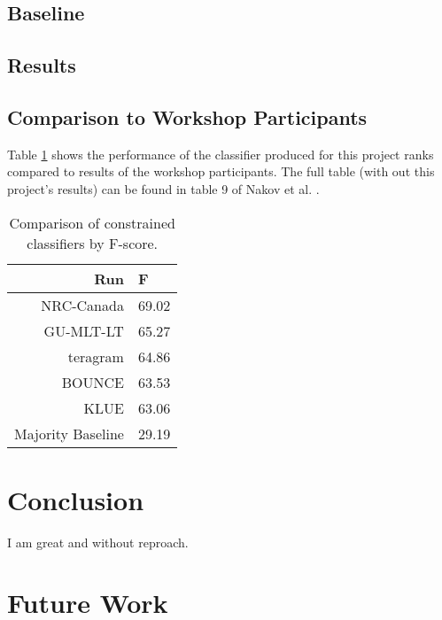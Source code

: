 \documentclass[12pt]{article}
\begin{document}

\subsection{Baseline}

\subsection{Results}

\subsection{Comparison to Workshop Participants}

Table \ref{table:comparison} shows the performance of the classifier produced
for this project ranks compared to results of the workshop participants. The
full table (with out this project's results) can be found in table 9 of Nakov
et al. \cite{Nakov2013}.

\begin{table}[H]
    \begin{center}
    \begin{tabular}{|r|l|}
        \hline
        Run & F \\
        \hline
        NRC-Canada & 69.02 \\
        GU-MLT-LT  & 65.27 \\
        teragram   & 64.86 \\
        BOUNCE     & 63.53 \\
        KLUE       & 63.06 \\
        \hline
        Majority Baseline & 29.19 \\
        \hline
    \end{tabular}
    \end{center}
    \caption{Comparison of constrained classifiers by F-score.}
    \label{table:comparison}
\end{table}


\section{Conclusion}

I am great and without reproach.


\section{Future Work}
\end{document}
